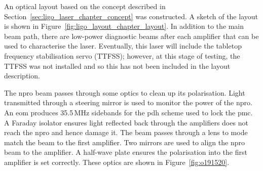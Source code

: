 		
An optical layout based on the concept described in Section~\ref{sec:ligo_laser_chapter_concept} was constructed. A sketch of the layout is shown in Figure~\ref{fig:ligo_layout_chapter_layout}. In addition to the main beam path, there are low-power diagnostic beams after each amplifier that can be used to characterise the laser. Eventually, this laser will include the tabletop frequency stabilisation servo (TTFSS); however, at this stage of testing, the TTFSS was not installed and so this has not been included in the layout description.
\par
The \gls{npro} beam passes through some optics to clean up its polarisation. Light transmitted through a steering mirror is used to monitor the power of the \gls{npro}. An \gls{eom} produces 35.5\,MHz sidebands for the \gls{pdh} scheme used to lock the \gls{pmc}. A Faraday isolator ensures light reflected back through the amplifiers does not reach the \gls{npro} and hence damage it. The beam passes through a lens to mode match the beam to the first amplifier. Two mirrors are used to align the \gls{npro} beam to the amplifier. A half-wave plate ensures the polarisation into the first amplifier is set correctly. These optics are shown in Figure~\ref{fig:o191520}.
\par
